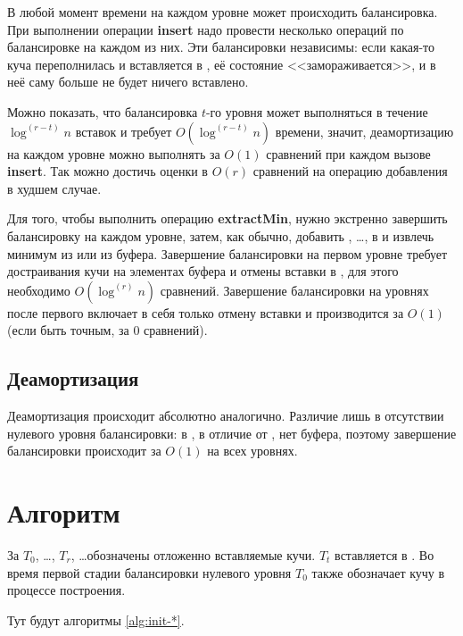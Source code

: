 В любой момент времени на каждом уровне может происходить балансировка. При выполнении
операции \textbf{insert} надо провести несколько операций по балансировке на каждом из них.
Эти балансировки независимы: если какая-то куча \MH[t] переполнилась и вставляется
в \MH[t+1], её состояние <<замораживается>>, и в неё саму больше не будет ничего вставлено.

Можно показать, что балансировка $t$-го уровня может выполняться в течение $\log^{(r-t)}n$
вставок и требует $O(\log^{(r-t)}n)$ времени, значит, деамортизацию на каждом уровне
можно выполнять за $O(1)$ сравнений при каждом вызове \textbf{insert}. Так можно
достичь оценки в $O(r)$ сравнений на операцию добавления в худшем случае.

Для того, чтобы выполнить операцию \textbf{extractMin}, нужно экстренно завершить
балансировку на каждом уровне, затем, как обычно, добавить \MH[1], \dots, \MH[r] в \HH
и извлечь минимум из \HH или из буфера. Завершение балансировки на первом уровне
требует достраивания кучи на элементах буфера и отмены вставки в \MH[1], для этого
необходимо $O(\log^{(r)} n)$ сравнений. Завершение балансировки на уровнях после
первого включает в себя только отмену вставки и производится за $O(1)$ (если быть
точным, за 0 сравнений).

\subsection{Деамортизация \CH[*]}
Деамортизация \CH[*] происходит абсолютно аналогично. Различие лишь в отсутствии
нулевого уровня  балансировки: в \CH[*], в отличие от \CH[r], нет буфера,
поэтому завершение балансировки происходит за $O(1)$ на всех уровнях.

\section{Алгоритм}
За $T_0$, \dots, $T_{r}$, \dots обозначены отложенно вставляемые кучи.
$T_t$ вставляется в \MH[t+1]. Во время первой стадии балансировки нулевого
уровня $T_0$ также обозначает кучу в процессе построения.

Тут будут алгоритмы \ref{alg:init-*}.


